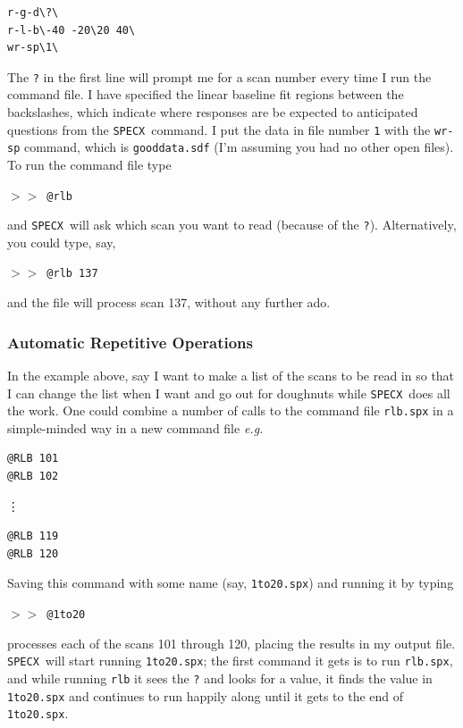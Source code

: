 \documentclass[11pt,twoside]{article}
\newcommand{\eg}{{\it e.g.}}
\newcommand{\SPECX}{{\tt SPECX}}
\newcommand{\SP}{{$>\!>$}}
\begin{document}
\begin{verbatim}
r-g-d\?\ 
r-l-b\-40 -20\20 40\ 
wr-sp\1\ 
\end{verbatim}

The {\tt ?} in the first line will prompt me for a scan number every
time I run the command file. I have specified the linear baseline fit
regions between the backslashes, which indicate where responses are be
expected to
anticipated questions from the
\SPECX\ command. I put the data in file number {\tt 1} with the {\tt wr-sp}
command, which is {\tt gooddata.sdf} (I'm assuming you had no other open
files). To run the command file type

\SP\ \verb|@rlb|

and \SPECX\ will ask which scan you want to read (because of the {\tt ?}). 
Alternatively, you could type, say,

\SP\ \verb|@rlb 137|

and the file will process scan 137, without any further ado.

\subsubsection{Automatic Repetitive Operations}
\label{sec:specx_9.3}
In the example above, say I want to make a list of the scans to be
read in so that I can change the list when I want and go out for
doughnuts while \SPECX\ does all the work.  One could combine a number
of calls to the command file {\tt rlb.spx} in a simple-minded way in a
new command file \eg\

\begin{verbatim}
@RLB 101
@RLB 102
\end{verbatim}
\vspace*{-0.1in}
\vdots
\vspace*{-0.1in}
\begin{verbatim}
@RLB 119
@RLB 120
\end{verbatim}

Saving this command with some name (say, {\tt 1to20.spx}) and running it 
by typing 

\SP\ {\tt @1to20}

processes each of the scans 101 through 120, placing the results in my
output file. \SPECX\ will start running {\tt 1to20.spx}; the first command
it gets is to run {\tt rlb.spx}, and while running {\tt rlb} it sees
the {\tt ?} and looks for a value, it finds the value in {\tt
1to20.spx} and continues to run happily along until it gets to the end
of {\tt 1to20.spx}.
\end{document}
